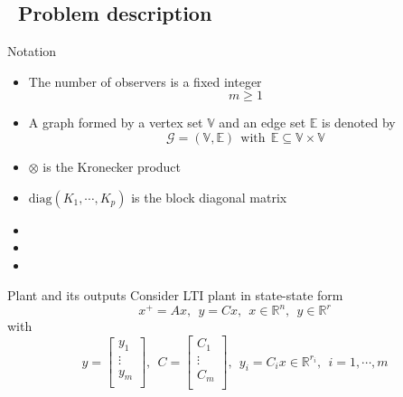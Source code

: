 \documentclass{beamer}
\newcommand{\R}{\mathbb{R}}
\begin{document}
\subsection{~Problem description}%
\begin{frame}{\color{blue} Notation}

\begin{itemize}
  \item The number of observers is a fixed integer
\begin{equation*}
m\geq 1
\end{equation*}

  \item A graph formed by a vertex set $\mathbb{V}$ and an edge set $\mathbb{E}$ is denoted by
\begin{equation*}
\mathcal{G}=(\mathbb{V},\mathbb{E}) ~~\text{with}~~ \mathbb{E}\subseteq\mathbb{V}\times\mathbb{V}
\end{equation*}

  \item $\otimes$ is the Kronecker product

  \item $\text{diag}(K_{1},\cdots,K_{p})$ is the block diagonal matrix

  \item

  \item

  \item
\end{itemize}


\end{frame}




\begin{frame}{\color{blue} Plant and its outputs}
Consider LTI plant in state-state form
\begin{equation*}
x^{+}=A x,~~ y=Cx,~~ x\in\R^{n},~~ y\in\R^{r}
\end{equation*}
with
\begin{equation*}
y=\begin{bmatrix} y_{1} \\ \vdots \\ y_{m} \\   \end{bmatrix},~~ C=\begin{bmatrix} C_{1} \\ \vdots \\ C_{m} \\   \end{bmatrix},~~
y_{i}=C_{i}x\in\R^{r_{i}},~~ i=1,\cdots,m
\end{equation*}
\end{frame}
\end{document}
